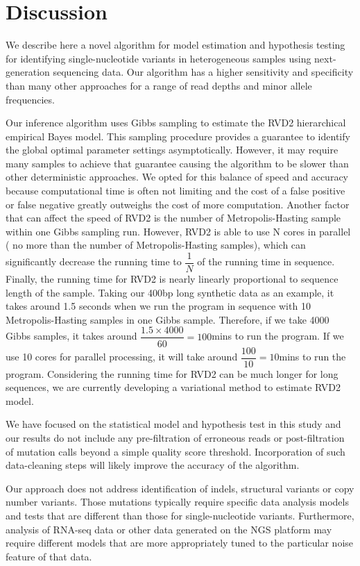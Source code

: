 \documentclass{bioinfo}
\begin{document}
\section{Discussion}
We describe here a novel algorithm for model estimation and hypothesis testing for identifying single-nucleotide variants in heterogeneous samples using next-generation sequencing data. Our algorithm has a higher sensitivity and specificity than many other approaches for a range of read depths and minor allele frequencies.

Our inference algorithm uses Gibbs sampling to estimate the RVD2 hierarchical empirical Bayes model. This sampling procedure provides a guarantee to identify the global optimal parameter settings asymptotically. However, it may require many samples to achieve that guarantee causing the algorithm to be slower than other deterministic approaches. We opted for this balance of speed and accuracy because computational time is often not limiting and the cost of a false positive or false negative greatly outweighs the cost of more computation. Another factor that can affect the speed of RVD2 is the number of Metropolis-Hasting sample within one Gibbs sampling run. However, RVD2 is able to use N cores in parallel ( no more than the number of Metropolis-Hasting samples), which can significantly decrease the running time to $ \dfrac{1}{N} $ of the running time in sequence. Finally, the running time for RVD2 is nearly linearly proportional to sequence length of the sample. Taking our 400bp long synthetic data as an example, it takes around 1.5 seconds when we run the program in sequence with 10 Metropolis-Hasting samples in one Gibbs sample. Therefore, if we take 4000 Gibbs samples, it takes around $ \dfrac{1.5\times4000}{60} = 100 $mins to run the program. If we use 10 cores for parallel processing, it will take around $ \dfrac{100}{10}=10 $mins to run the program. Considering the running time for RVD2 can be much longer for long sequences, we are currently developing a variational method to estimate RVD2 model.

We have focused on the statistical model and hypothesis test in this study and our results do not include any pre-filtration of erroneous reads or post-filtration of mutation calls beyond a simple quality score threshold. Incorporation of such data-cleaning steps will likely improve the accuracy of the algorithm.

Our approach does not address identification of indels, structural variants or copy number variants. Those mutations typically require specific data analysis models and tests that are different than those for single-nucleotide variants. Furthermore, analysis of RNA-seq data or other data generated on the NGS platform may require different models that are more appropriately tuned to the particular noise feature of that data.
\end{document}
